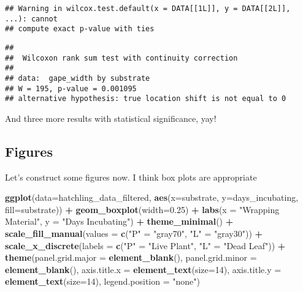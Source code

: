 \documentclass[
]{article}
\newenvironment{Shaded}{\begin{snugshade}}{\end{snugshade}}
\newcommand{\AttributeTok}[1]{\textcolor[rgb]{0.13,0.29,0.53}{#1}}
\newcommand{\DecValTok}[1]{\textcolor[rgb]{0.00,0.00,0.81}{#1}}
\newcommand{\FloatTok}[1]{\textcolor[rgb]{0.00,0.00,0.81}{#1}}
\newcommand{\FunctionTok}[1]{\textcolor[rgb]{0.13,0.29,0.53}{\textbf{#1}}}
\newcommand{\NormalTok}[1]{#1}
\newcommand{\OtherTok}[1]{\textcolor[rgb]{0.56,0.35,0.01}{#1}}
\newcommand{\SpecialCharTok}[1]{\textcolor[rgb]{0.81,0.36,0.00}{\textbf{#1}}}
\newcommand{\StringTok}[1]{\textcolor[rgb]{0.31,0.60,0.02}{#1}}
\begin{document}
\begin{verbatim}
## Warning in wilcox.test.default(x = DATA[[1L]], y = DATA[[2L]], ...): cannot
## compute exact p-value with ties
\end{verbatim}

\begin{verbatim}
## 
##  Wilcoxon rank sum test with continuity correction
## 
## data:  gape_width by substrate
## W = 195, p-value = 0.001095
## alternative hypothesis: true location shift is not equal to 0
\end{verbatim}

And three more results with statistical significance, yay!

\subsection{Figures}\label{figures}

Let's construct some figures now. I think box plots are appropriate

\begin{Shaded}
\begin{Highlighting}[]
\FunctionTok{ggplot}\NormalTok{(}\AttributeTok{data=}\NormalTok{hatchling\_data\_filtered, }\FunctionTok{aes}\NormalTok{(}\AttributeTok{x=}\NormalTok{substrate, }\AttributeTok{y=}\NormalTok{days\_incubating, }\AttributeTok{fill=}\NormalTok{substrate)) }\SpecialCharTok{+}
  \FunctionTok{geom\_boxplot}\NormalTok{(}\AttributeTok{width=}\FloatTok{0.25}\NormalTok{) }\SpecialCharTok{+}
  \FunctionTok{labs}\NormalTok{(}\AttributeTok{x =} \StringTok{"Wrapping Material"}\NormalTok{, }\AttributeTok{y =} \StringTok{"Days Incubating"}\NormalTok{) }\SpecialCharTok{+}
  \FunctionTok{theme\_minimal}\NormalTok{() }\SpecialCharTok{+}
  \FunctionTok{scale\_fill\_manual}\NormalTok{(}\AttributeTok{values =} \FunctionTok{c}\NormalTok{(}\StringTok{"P"} \OtherTok{=} \StringTok{"gray70"}\NormalTok{, }\StringTok{"L"} \OtherTok{=} \StringTok{"gray30"}\NormalTok{)) }\SpecialCharTok{+} 
  \FunctionTok{scale\_x\_discrete}\NormalTok{(}\AttributeTok{labels =} \FunctionTok{c}\NormalTok{(}\StringTok{"P"} \OtherTok{=} \StringTok{"Live Plant"}\NormalTok{, }\StringTok{"L"} \OtherTok{=} \StringTok{"Dead Leaf"}\NormalTok{)) }\SpecialCharTok{+}
  \FunctionTok{theme}\NormalTok{(}\AttributeTok{panel.grid.major =} \FunctionTok{element\_blank}\NormalTok{(),}
        \AttributeTok{panel.grid.minor =} \FunctionTok{element\_blank}\NormalTok{(),}
        \AttributeTok{axis.title.x =} \FunctionTok{element\_text}\NormalTok{(}\AttributeTok{size=}\DecValTok{14}\NormalTok{),}
        \AttributeTok{axis.title.y =} \FunctionTok{element\_text}\NormalTok{(}\AttributeTok{size=}\DecValTok{14}\NormalTok{),}
        \AttributeTok{legend.position =} \StringTok{"none"}\NormalTok{)}
\end{Highlighting}
\end{Shaded}
\end{document}

